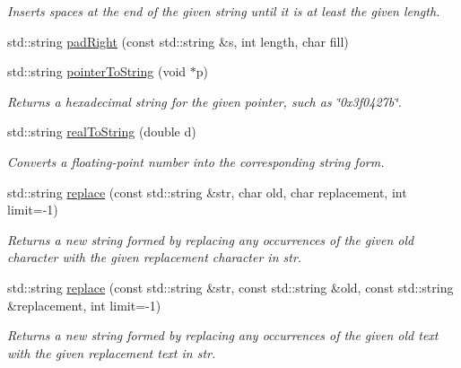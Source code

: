 \begin{DoxyCompactItemize}
\begin{DoxyCompactList}\small\item\em Inserts spaces at the end of the given string until it is at least the given length. \end{DoxyCompactList}\item 
std\+::string \mbox{\hyperlink{namespacesgl_1_1priv_1_1strlib_ac5ec1322098b5170af6c580bd1e01b3b}{pad\+Right}} (const std\+::string \&s, int length, char fill)
\item 
std\+::string \mbox{\hyperlink{namespacesgl_1_1priv_1_1strlib_a531909a249cc38a472816a42eb9329e8}{pointer\+To\+String}} (void $\ast$p)
\begin{DoxyCompactList}\small\item\em Returns a hexadecimal string for the given pointer, such as \char`\"{}0x3f0427b\char`\"{}. \end{DoxyCompactList}\item 
std\+::string \mbox{\hyperlink{namespacesgl_1_1priv_1_1strlib_af1835c719cd027ed09ca12e7b700c7d7}{real\+To\+String}} (double d)
\begin{DoxyCompactList}\small\item\em Converts a floating-\/point number into the corresponding string form. \end{DoxyCompactList}\item 
std\+::string \mbox{\hyperlink{namespacesgl_1_1priv_1_1strlib_a9ee83dec7fbd7c18bc68ee91502ed839}{replace}} (const std\+::string \&str, char old, char replacement, int limit=-\/1)
\begin{DoxyCompactList}\small\item\em Returns a new string formed by replacing any occurrences of the given \textquotesingle{}old\textquotesingle{} character with the given replacement character in \textquotesingle{}str\textquotesingle{}. \end{DoxyCompactList}\item 
std\+::string \mbox{\hyperlink{namespacesgl_1_1priv_1_1strlib_a378825875fe99bccd7d7aa8f971d2ea3}{replace}} (const std\+::string \&str, const std\+::string \&old, const std\+::string \&replacement, int limit=-\/1)
\begin{DoxyCompactList}\small\item\em Returns a new string formed by replacing any occurrences of the given \textquotesingle{}old\textquotesingle{} text with the given replacement text in \textquotesingle{}str\textquotesingle{}. \end{DoxyCompactList}\item 

\end{DoxyCompactItemize}
